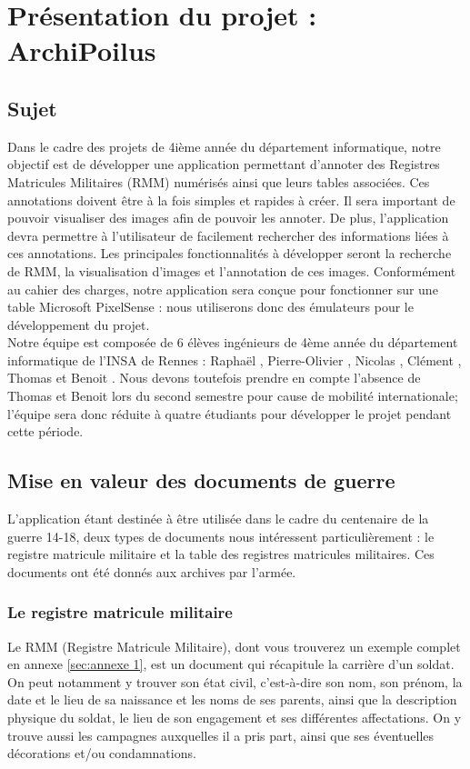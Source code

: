 \documentclass[a4paper]{article}
\begin{document}
\newpage

\section{Présentation du projet : ArchiPoilus}

\subsection{Sujet}

	Dans le cadre des projets de 4ième année du département informatique, notre objectif est de développer une application permettant d’annoter des Registres Matricules Militaires (RMM) numérisés ainsi que leurs tables associées. Ces annotations doivent être à la fois simples et rapides à créer. Il sera important de pouvoir visualiser des images afin de pouvoir les annoter. De plus, l’application devra permettre à l’utilisateur de facilement rechercher des informations liées à ces annotations. Les principales fonctionnalités à développer seront la recherche de RMM, la visualisation d’images et l’annotation de ces images. Conformément au cahier des charges, notre application sera conçue pour fonctionner sur une table Microsoft PixelSense : nous utiliserons donc des émulateurs pour le développement du projet.\\
	
	Notre équipe est composée de 6 élèves ingénieurs de 4ème année du département informatique de l’INSA de Rennes : Raphaël , Pierre-Olivier , Nicolas , Clément , Thomas  et Benoit . Nous devons toutefois prendre en compte l’absence de Thomas et Benoit lors du second semestre pour cause de mobilité internationale; l’équipe sera donc réduite à quatre étudiants pour développer le projet pendant cette période.

\subsection{Mise en valeur des documents de guerre}

	L'application étant destinée à être utilisée dans le cadre du centenaire de la guerre 14-18, deux types de documents nous intéressent particulièrement : le registre matricule militaire et la table des registres matricules militaires. Ces documents ont été donnés aux archives par l'armée.

\subsubsection{Le registre matricule militaire}
	Le RMM (Registre Matricule Militaire), dont vous trouverez un exemple complet en annexe \ref{sec:annexe 1}, est un document qui récapitule la carrière d'un soldat. On peut notamment y trouver son état civil, c'est-à-dire son nom, son prénom, la date et le lieu de sa naissance et les noms de ses parents, ainsi que la description physique du soldat, le lieu de son engagement et ses différentes affectations. On y trouve aussi les campagnes auxquelles il a pris part, ainsi que ses éventuelles décorations et/ou condamnations.\\
\end{document}
